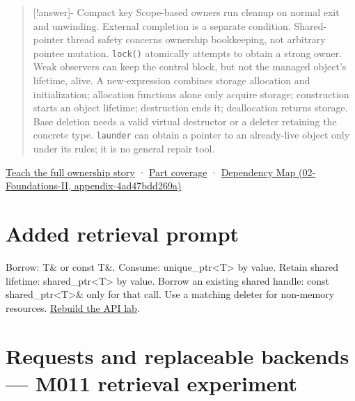 \begin{quote}
{[}!answer{]}- Compact key Scope-based owners run cleanup on normal exit and unwinding. External completion is a separate condition. Shared-pointer thread safety concerns ownership bookkeeping, not arbitrary pointee mutation. \texttt{lock()} atomically attempts to obtain a strong owner. Weak observers can keep the control block, but not the managed object's lifetime, alive. A new-expression combines storage allocation and initialization; allocation functions alone only acquire storage; construction starts an object lifetime; destruction ends it; deallocation returns storage. Base deletion needs a valid virtual destructor or a deleter retaining the concrete type. \texttt{launder} can obtain a pointer to an already-live object only under its rules; it is no general repair tool.
\end{quote}

\href{Continuous\%20Notes/Computing\%20Foundations\%20-\%20From\%20Bits\%20to\%20C++\%20and\%20Systems\%20APIs\#From\%20a\%20live\%20object\%20to\%20responsible\%20resource\%20ownership}{Teach the full ownership story} · \hyperref[appendix-fd090d982a15-m010---parts-148-160]{Part coverage} · \href{../02-Foundations-II/main.pdf\#nameddest=appendix-4ad47bdd269a}{Dependency Map (02-Foundations-II, appendix-4ad47bdd269a)}

\section{Added retrieval prompt}\label{appendix-960160274237-added-retrieval-prompt}

Borrow: T\& or const T\&. Consume: unique\_ptr\textless T\textgreater{} by value. Retain shared lifetime: shared\_ptr\textless T\textgreater{} by value. Borrow an existing shared handle: const shared\_ptr\textless T\textgreater{}\& only for that call. Use a matching deleter for non-memory resources. \href{Continuous\%20Notes/Computing\%20Foundations\%20-\%20From\%20Bits\%20to\%20C++\%20and\%20Systems\%20APIs\#Worked\%20API\%20choice:\%20borrow,\%20consume,\%20retain,\%20or\%20copy\%20a\%20value}{Rebuild the API lab}.

\section{Requests and replaceable backends --- M011 retrieval experiment}\label{appendix-960160274237-requests-and-replaceable-backends-m011-retrieval-experiment}

